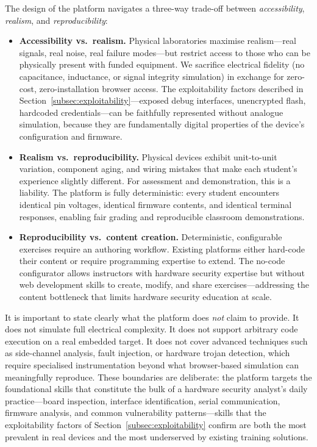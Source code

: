 The design of the \pcbctf{} platform navigates a three-way trade-off between \emph{accessibility}, \emph{realism}, and \emph{reproducibility}:

\begin{itemize}
    \item \textbf{Accessibility vs.\ realism.} Physical laboratories maximise realism---real signals, real noise, real failure modes---but restrict access to those who can be physically present with funded equipment. We sacrifice electrical fidelity (no capacitance, inductance, or signal integrity simulation) in exchange for zero-cost, zero-installation browser access. The exploitability factors described in Section~\ref{subsec:exploitability}---exposed debug interfaces, unencrypted flash, hardcoded credentials---can be faithfully represented without analogue simulation, because they are fundamentally digital properties of the device's configuration and firmware.

    \item \textbf{Realism vs.\ reproducibility.} Physical devices exhibit unit-to-unit variation, component aging, and wiring mistakes that make each student's experience slightly different. For assessment and demonstration, this is a liability. The \pcbctf{} platform is fully deterministic: every student encounters identical pin voltages, identical firmware contents, and identical terminal responses, enabling fair grading and reproducible classroom demonstrations.

    \item \textbf{Reproducibility vs.\ content creation.} Deterministic, configurable exercises require an authoring workflow. Existing platforms either hard-code their content or require programming expertise to extend. The \pcbctf{} no-code configurator allows instructors with hardware security expertise but without web development skills to create, modify, and share exercises---addressing the content bottleneck that limits hardware security education at scale.
\end{itemize}

It is important to state clearly what the platform does \emph{not} claim to provide. It does not simulate full electrical complexity. It does not support arbitrary code execution on a real embedded target. It does not cover advanced techniques such as side-channel analysis, fault injection, or hardware trojan detection, which require specialised instrumentation beyond what browser-based simulation can meaningfully reproduce. These boundaries are deliberate: the platform targets the foundational skills that constitute the bulk of a hardware security analyst's daily practice---board inspection, interface identification, serial communication, firmware analysis, and common vulnerability patterns---skills that the exploitability factors of Section~\ref{subsec:exploitability} confirm are both the most prevalent in real devices and the most underserved by existing training solutions.
